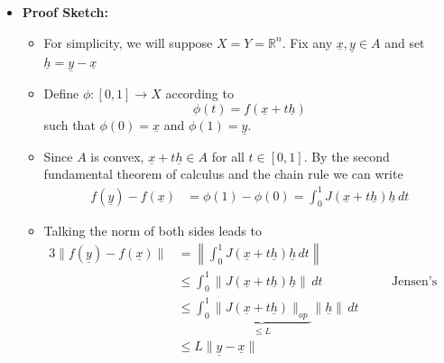 \documentclass[11pt,twoside]{report}
\newcommand{\bbR}{{\mathbb{R}}}
\newcommand{\vecnot}{\underline}
\begin{document}
\begin{itemize}
\item \textbf{Proof Sketch:} 
\begin{itemize}
\item For simplicity, we will suppose $X = Y = \bbR^n$. %
 Fix any $\vecnot{x}, \vecnot{y} \in A$ and set $\vecnot{h} = \vecnot{y} - \vecnot{x}$
\item Define  $\phi \colon [0,1] \to X$ according to 
\[
\phi(t) =f (  \vecnot{x} + t  \vecnot{h} ) 
\]
such that $\phi(0) = \vecnot{x}$ and $\phi(1) = \vecnot{y}$. 
\item Since $A$ is convex, $\vecnot{x} + t  \vecnot{h}\in A$ for all $t \in [0,1]$. By the second fundamental theorem of calculus and the chain rule we can write
\begin{align*}
f(\vecnot{y}) - f( \vecnot{x}) & =\phi(1)  - \phi(0)   = \int_0^1J ( \vecnot{x} + t \vecnot{h})  \vecnot{h} \, dt %
\end{align*}
\item 
Talking the norm of both sides leads to 
\begin{alignat*}{3}
\| f(\vecnot{y}) - f( \vecnot{x}) \|& =  \left\|  \int_0^1J ( \vecnot{x} + t \vecnot{h})  \vecnot{h} \, dt  \right\|  \\
& \le   \int_0^1 \left\| J ( \vecnot{x} + t \vecnot{h})   \vecnot{h}\right\|  \, dt &\quad & \text{Jensen's inequality}\\
& \le   \int_0^1 \underbrace{\|  J ( \vecnot{x} + t \vecnot{h}) \|_{op} }_{\le L}    \| \vecnot{h} \|   \, dt\\
& \le L\| \vecnot{y} - \vecnot{x}\| %
\end{alignat*}
\end{itemize}

\end{itemize}
\end{document}
